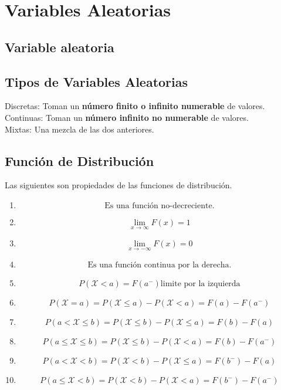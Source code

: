 \chapter{Variables Aleatorias}
\section{Variable aleatoria}

\section{Tipos de Variables Aleatorias}
Discretas: Toman un \textbf{número finito o infinito numerable} de valores.\\
Continuas: Toman un \textbf{número infinito no numerable} de valores.\\
Mixtas: Una mezcla de las dos anteriores.

\section{Función de Distribución}

Las siguientes son propiedades de las funciones de distribución.
\begin{enumerate}
  \item $$\text{Es una función no-decreciente.}$$
  \item \[ \lim_{x \to \infty} F(x) = 1 \]
  \item \[ \lim_{x \to -\infty} F(x) = 0 \]
  \item $$\text{Es una función continua por la derecha.}$$
  \item \[ P(\mathcal X < a) = F(a^-) \text{limite por la izquierda}\]
  \item \[ P(\mathcal X = a) = P(\mathcal X \le a) - P(\mathcal X < a) = F(a) - F(a^-) \]
  \item \[ P(a< \mathcal X \le b) = P(\mathcal X \le b) - P(\mathcal X \le a) = F(b) - F(a) \]
  \item \[ P(a \le \mathcal X \le b) = P(\mathcal X \le b) - P(\mathcal X < a) = F(b) - F(a^-) \]
  \item \[ P(a < \mathcal X < b) = P(\mathcal X < b) - P(\mathcal X \le a) = F(b^-) - F(a) \]
  \item \[ P(a \le \mathcal X < b) = P(\mathcal X < b) - P(\mathcal X < a) = F(b^-) - F(a^-) \]
\end{enumerate}

